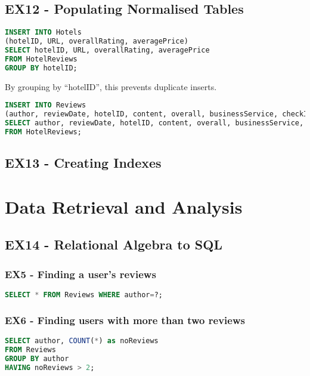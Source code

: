 \documentclass[a4paper]{article}
\begin{document}
\subsection{EX12 - Populating Normalised Tables} 
\begin{lstlisting}[language=SQL, style=default]
INSERT INTO Hotels
(hotelID, URL, overallRating, averagePrice)
SELECT hotelID, URL, overallRating, averagePrice
FROM HotelReviews
GROUP BY hotelID;
\end{lstlisting}
By grouping by ``hotelID'', this prevents duplicate inserts.

\begin{lstlisting}[language=SQL, style=default]
INSERT INTO Reviews
(author, reviewDate, hotelID, content, overall, businessService, checkIn, cleanliness, rooms, service, value, noReaders, noHelpful)
SELECT author, reviewDate, hotelID, content, overall, businessService, checkIn, cleanliness, rooms, service, value, noReaders, noHelpful
FROM HotelReviews;
\end{lstlisting}
\subsection{EX13 - Creating Indexes}

\section{Data Retrieval and Analysis}
\subsection{EX14 - Relational Algebra to SQL}
\subsubsection{EX5 - Finding a user's reviews}
\begin{lstlisting}[language=SQL, style=default]
SELECT * FROM Reviews WHERE author=?;
\end{lstlisting}

\subsubsection{EX6 - Finding users with more than two reviews}
\begin{lstlisting}[language=SQL, style=default]
SELECT author, COUNT(*) as noReviews
FROM Reviews
GROUP BY author
HAVING noReviews > 2;
\end{lstlisting}
\end{document}
